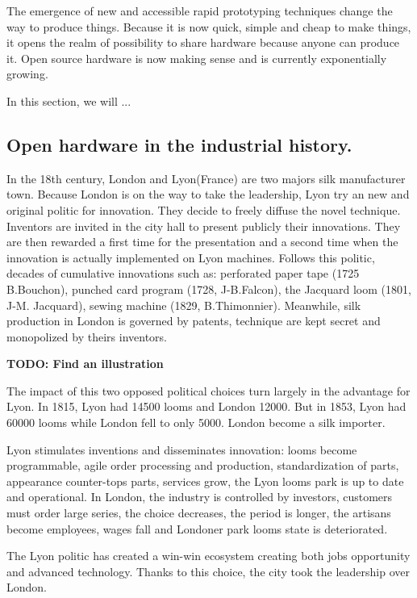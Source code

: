 The emergence of new and accessible rapid prototyping techniques change the way to produce things. Because it is now quick, simple and cheap to make things, it opens the realm of possibility to share hardware because anyone can produce it. Open source hardware is now making sense and is currently exponentially growing.

In this section, we will ...

\subsection{Open hardware in the industrial history.} %

In the 18th century, London and Lyon(France) are two majors silk manufacturer town. Because London is on the way to take the leadership, Lyon try an new and original politic for innovation. They decide to freely diffuse the novel technique. Inventors are invited in the city hall to present publicly their innovations. They are then rewarded a first time for the presentation and a second time when the innovation is actually implemented on Lyon machines. Follows this politic, decades of cumulative innovations such as: perforated paper tape (1725 B.Bouchon), punched card program (1728, J-B.Falcon), the Jacquard loom (1801, J-M. Jacquard), sewing machine (1829, B.Thimonnier). Meanwhile, silk production in London is governed by patents, technique are kept secret and monopolized by theirs inventors. \cite{alain1997fate}

\textbf{TODO: Find an illustration}

The impact of this two opposed political choices turn largely in the advantage for Lyon. In 1815, Lyon had 14500 looms and London 12000. But in 1853, Lyon had 60000 looms while London fell to only 5000. London become a silk importer.

Lyon stimulates inventions and disseminates innovation: looms become programmable, agile order processing and production, standardization of parts, appearance counter-tops parts, services grow, the Lyon looms park is up to date and operational.
In London, the industry is controlled by investors, customers must order large series, the choice decreases, the period is longer, the artisans become employees, wages fall and Londoner park looms state is deteriorated.

The Lyon politic has created a win-win ecosystem creating both jobs opportunity and advanced technology. Thanks to this choice, the city took the leadership over London.

